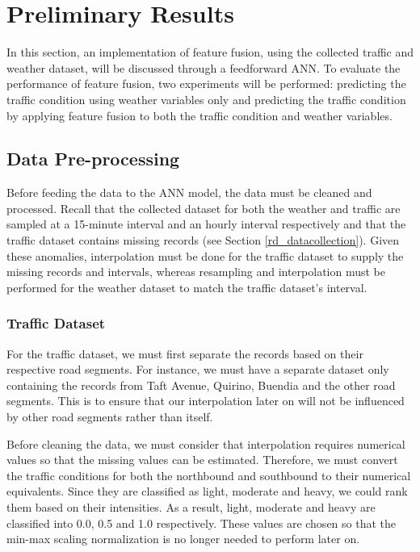 %
%
%                 

\chapter{Preliminary Results}
\label{sec:appendixe}


In this section, an implementation of feature fusion, using the collected traffic and weather dataset, will be discussed through a feedforward ANN. To evaluate the performance of feature fusion, two experiments will be performed: predicting the traffic condition using weather variables only and predicting the traffic condition by applying feature fusion to both the traffic condition and weather variables.

\section{Data Pre-processing}
Before feeding the data to the ANN model, the data must be cleaned and processed. Recall that the collected dataset for both the weather and traffic are sampled at a 15-minute interval and an hourly interval respectively and that the traffic dataset contains missing records (see Section \ref{rd_datacollection}). Given these anomalies, interpolation must be done for the traffic dataset to supply the missing records and intervals, whereas resampling and interpolation must be performed for the weather dataset to match the traffic dataset’s interval.

\subsection{Traffic Dataset}
For the traffic dataset, we must first separate the records based on their respective road segments. For instance, we must have a separate dataset only containing the records from Taft Avenue, Quirino, Buendia and the other road segments. This is to ensure that our interpolation later on will not be influenced by other road segments rather than itself.

Before cleaning the data, we must consider that interpolation requires numerical values so that the missing values can be estimated. Therefore, we must convert the traffic conditions for both the northbound and southbound to their numerical equivalents. Since they are classified as light, moderate and heavy, we could rank them based on their intensities. As a result, light, moderate and heavy are classified into 0.0, 0.5 and 1.0 respectively. These values are chosen so that the min-max scaling normalization is no longer needed to perform later on.

